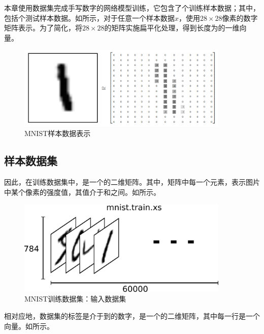\begin{content}

本章使用数据集完成手写数字的网络模型训练，它包含了个训练样本数据；其中，包括个测试样本数据。如所示，对于任意一个样本数据$x$，使用$28 \times 28$像素的数字矩阵表示。为了简化，将$28 \times 28$的矩阵实施扁平化处理，得到长度为的一维向量。

\begin{figure}[H]
\centering
\includegraphics[width=0.9\textwidth]{figures/mnist-x.png}
\caption{MNIST样本数据表示}
 \label{fig:mnist-x}
\end{figure}

\subsection{样本数据集}

因此，在训练数据集中，是一个\code{[60000, 784]}的二维矩阵。其中，矩阵中每一个元素，表示图片中某个像素的强度值，其值介于和之间。如所示。

\begin{figure}[H]
\centering
\includegraphics[width=0.9\textwidth]{figures/mnist-train-xs.png}
\caption{MNIST训练数据集：输入数据集}
 \label{fig:mnist-train-xs}
\end{figure}

相对应地，数据集的标签是介于到的数字，是一个\code{[60000, 10]}的二维矩阵，其中每一行是一个向量。如所示。


\end{content}
